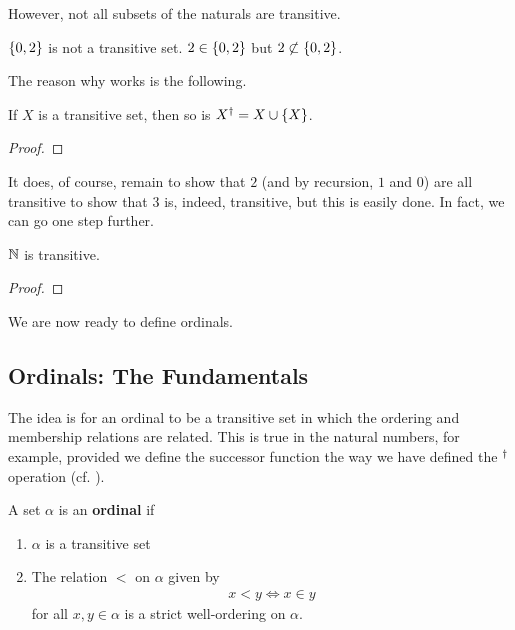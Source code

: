 However, not all subsets of the naturals are transitive.

\begin{boxnexample}
    $\left\{ 0, 2 \right\}$ is not a transitive set. $2 \in \left\{ 0, 2 \right\}$ but $2 \not\subset \left\{ 0, 2 \right\}$.
\end{boxnexample}

The reason why  works is the following.

\begin{boxlemma}\label{Ch2:Lemma:succ_trans}
    If $X$ is a transitive set, then so is $X^{\dagger} = X \cup \left\{ X \right\}$.
\end{boxlemma}
\begin{proof}
    \sorry
\end{proof}

It does, of course, remain to show that $2$ (and by recursion, $1$ and $0$) are all transitive to show that $3$ is, indeed, transitive, but this is easily done. In fact, we can go one step further.

\begin{boxtheorem}\label{Ch3:Thm:Nat_trans}
    $\mathbb{N}$ is transitive.
\end{boxtheorem}
\begin{proof}
    \sorry %
\end{proof}

We are now ready to define ordinals.

\subsection{Ordinals: The Fundamentals}

The idea is for an ordinal to be a transitive set in which the ordering and membership relations are related. This is true in the natural numbers, for example, provided we define the successor function the way we have defined the $^{\dagger}$ operation (cf. ).

\begin{boxdefinition}[Ordinal]\label{Ch3:Def:Ordinal}
    A set $\alpha$ is an \textbf{ordinal} if
    \begin{enumerate}
        \item $\alpha$ is a transitive set
        \item The relation $<$ on $\alpha$ given by
        \begin{align*}
            x < y \iff x \in y
        \end{align*}
        for all $x, y \in \alpha$ is a strict well-ordering on $\alpha$.
    \end{enumerate}
\end{boxdefinition}

